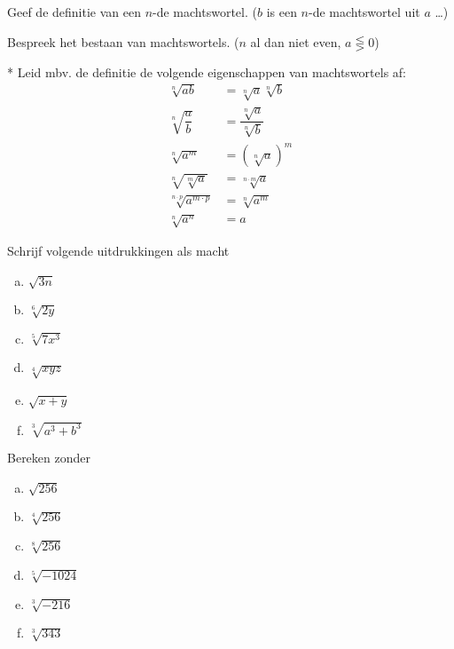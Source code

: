 \documentclass[12pt,twoside]{article}
\begin{document}
\begin{oefening}
Geef de definitie van een $n$-de machtswortel. ($b$ is een $n$-de machtswortel uit $a$ \ldots)
\end{oefening}

\begin{oefening}
Bespreek het bestaan van machtswortels. ($n$ al dan niet even, $a \lesseqgtr 0$)
\end{oefening}

\begin{oefening}*
Leid mbv. de definitie de volgende eigenschappen van machtswortels af:
\begin{align*}
  \sqrt[n]{ab} &= \sqrt[n]{a}\sqrt[n]{b}\\
  \sqrt[n]{\dfrac{a}{b}} &= \dfrac{\sqrt[n]{a}}{\sqrt[n]{b}}\\
  \sqrt[n]{a^m} &= \left(\sqrt[n]{a}\right)^m\\
  \sqrt[n]{\sqrt[m]{a}} &= \sqrt[n\cdot m]{a}\\
  \sqrt[n\cdot p]{a^{m\cdot p}} &= \sqrt[n]{a^m}\\
  \sqrt[n]{a^n} &= a
\end{align*}
\end{oefening}

\begin{oefening}
  Schrijf volgende uitdrukkingen als macht
  \begin{multicols}{3}
    \begin{enumerate}[(a)]
      \itemsep1em
    \item \(\sqrt {3n} \)
    \item \(\sqrt[6]{{2y}}\)
    \item \(\sqrt[5]{{7{x^3}}}\)
    \item \(\sqrt[4]{{xyz}}\)
    \item \(\sqrt {x + y} \)
    \item \(\sqrt[3]{{{a^3} + {b^3}}}\)
    \end{enumerate}
  \end{multicols}
\end{oefening}

\begin{oefening}
  Bereken zonder 
  \begin{multicols}{3}
    \begin{enumerate}[(a)]
      \itemsep1em
    \item \(\sqrt {256} \)
    \item \(\sqrt[4]{{256}}\)
    \item \(\sqrt[8]{{256}}\)
    \item \(\sqrt[5]{{ - 1024}}\)
    \item \(\sqrt[3]{{ - 216}}\)
    \item \(\sqrt[3]{{343}}\)
    \end{enumerate}
  \end{multicols}
\end{oefening}
\end{document}
